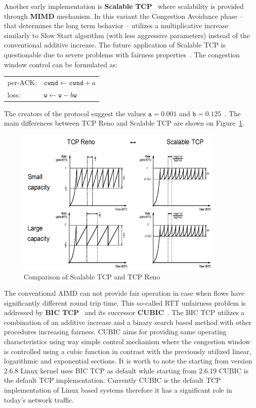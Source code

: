 \documentclass[a4paper]{article}
\begin{document}
Another early implementation is \textbf{Scalable TCP}~\cite{ScalableTCP} where scalability is provided through \textbf{MIMD} mechanism. In this variant the Congestion Avoidance phase  -- that determines the long term behavior -- utilizes a multiplicative increase similarly to Slow Start algorithm (with less aggressive parameters) instead of the conventional additive increase. The future application of Scalable TCP is questionable due to severe problems with fairness properties~\cite{TCPFairnessAnalysis}. The congestion window control can be formulated as:

\begin{tabular}{ll}
per-ACK: & $\texttt{cwnd} \leftarrow \texttt{cwnd} + a$ \\
loss: & $\texttt{w} \leftarrow \texttt{w} - b \texttt{w}$ \\
\end{tabular} 

The creators of the protocol suggest the values $\texttt{a}=0.001$ and $\texttt{b}=0.125$~\cite{ScalableTCP}. The main differences between TCP Reno and Scalable TCP are shown on Figure~\ref{fig:ScalableVSReno}.

\begin{figure}[H]
    \centering
    \includegraphics[width=0.9\textwidth]{figures/ScalableTCP.png}
    \caption{Comparison of Scalable TCP and TCP Reno}
    \label{fig:ScalableVSReno}
\end{figure}

The conventional AIMD can not provide fair operation in case when flows have significantly different round trip time. This so-called RTT unfairness problem is addressed by \textbf{BIC TCP}~\cite{BICTCP} and its successor \textbf{CUBIC}~\cite{CUBIC}. The BIC TCP utilizes a combination of an additive increase and a binary search based method with other procedures increasing fairness. CUBIC aims for providing same operating characteristics using way simple control mechanism where the congestion window is controlled using a cubic function in contrast with the previously utilized linear, logarithmic and exponential sections. It is worth to note the starting from version 2.6.8 Linux kernel uses BIC TCP as default while starting from 2.6.19 CUBIC is the default TCP implementation. Currently CUBIC is the default TCP implementation of Linux based systems therefore it has a significant role in today's network traffic.
\end{document}
